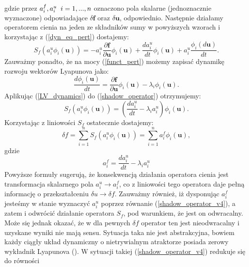 \documentclass[12pt, twoside]{book}
\begin{document}
gdzie przez $ a^{f}_{i},a^{u}_{i} \thickspace \thickspace i=1,...,n$ oznaczono pola skalarne (jednoznacznie wyznaczone) odpowiadające $ \delta \textbf{f}  $ oraz $ \delta \textbf{u}  $, odpowiednio. Następnie działamy operatorem cienia na jeden ze składników sumy w powyższych wzorach i korzystając z (\ref{dyn_eq_pert}) dostajemy:
\begin{equation}
S_{f}(a^{u}_{i}\phi_{i}(\textbf{u})) = -a^{u}_{i}\frac{\partial{\textbf{f}}}{\partial{\textbf{u}}} \phi_{i}(\textbf{u}) + \frac{da^{u}_{i}}{dt}\phi_{i}(\textbf{u}) + a^{u}_{i}\frac{\phi_{i}(d\textbf{u})}{dt}.
\label{shadow_operator}
\end{equation}
Zauważmy ponadto, że na mocy (\ref{funct_pert}) możemy zapisać dynamikę rozwoju wektorów Lyapunova jako:
\begin{equation}
\frac{d\phi_{i}(\textbf{u})}{dt} = \frac{\partial{\textbf{f}}}{\partial{\textbf{u}}}\phi_{i}(\textbf{u}) - \lambda_{i}\phi_{i}(\textbf{u}).
\label{LV_dynamics}
\end{equation}
Aplikując (\ref{LV_dynamics}) do (\ref{shadow_operator}) otrzymujemy:
\begin{equation}
S_{f}(a^{u}_{i}\phi_{i}(\textbf{u})) = (\frac{da^{u}_{i}}{dt} - \lambda_{i}a^{u}_{i})\phi_{i}(\textbf{u}).
\label{shadow_operator_v2}
\end{equation}
Korzystając z liniowości $ S_{f} $ ostatecznie dostajemy:
\begin{equation}
\delta f = \sum_{i=1}^{n}S_{f}(a^{u}_{i}\phi_{i}(\textbf{u})) = \sum_{i=1}^{n}a^{f}_{i}\phi_{i}(\textbf{u}),
\label{shadow_operator_v3}
\end{equation}
gdzie 
\begin{equation}
a^{f}_{i} = \frac{da^{u}_{i}}{dt} - \lambda_{i}a^{u}_{i}
\label{shadow_operator_v4}
\end{equation}
Powyższe formuły sugerują, że konsekwencją działania operatora cienia jest transformacja skalarnego pola $ a^{u}_{i} \rightarrow a^{f}_{i} $, co z liniowości tego operatora daje pełną informację o przekształceniu $ \delta u \rightarrow \delta f $. Zauważmy również, iż dysponując $ a^{f}_{i} $ jesteśmy w stanie wyznaczyć $ a^{u}_{i} $ poprzez równanie (\ref{shadow_operator_v4}), a zatem i odwrócić działanie operatora $ S_{f} $, pod warunkiem, że jest on odwracalny. Może się jednak okazać, że w dla pewnych $ \delta f $ operator ten jest nieodwracalny i uzyskane wyniki nie mają sensu. Sytuacja taka nie jest abstrakcyjna, bowiem każdy ciągły układ dynamiczny o nietrywialnym atraktorze posiada zerowy wykładnik Lyapunova (\cite{Qiqi1}). W sytuacji takiej (\ref{shadow_operator_v4}) redukuje się do równości
\end{document}
